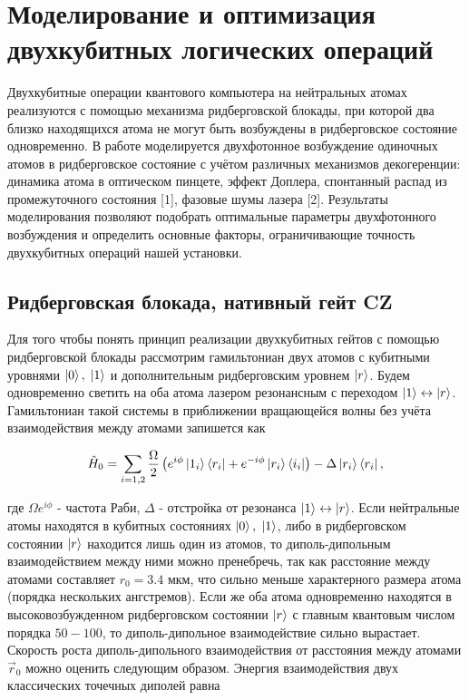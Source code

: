 \section{Моделирование и оптимизация двухкубитных логических операций}
\label{sec:chapter_4}

Двухкубитные операции квантового компьютера на нейтральных атомах реализуются с помощью механизма ридберговской блокады, при которой два близко находящихся атома не могут быть возбуждены в ридберговское состояние одновременно. В работе моделируется двухфотонное возбуждение одиночных атомов в ридберговское состояние с учётом различных механизмов декогеренции: динамика атома в оптическом пинцете, эффект Доплера, спонтанный распад из промежуточного состояния [1], фазовые шумы лазера [2]. Результаты моделирования позволяют подобрать оптимальные параметры двухфотонного возбуждения и определить основные факторы, ограничивающие точность двухкубитных операций нашей установки.

\subsection{Ридберговская блокада, нативный гейт CZ}

Для того чтобы понять принцип реализации двухкубитных гейтов с помощью ридберговской блокады рассмотрим гамильтониан двух атомов с кубитными уровнями $\left| 0 \right\rangle, \; \left| 1 \right\rangle$ и дополнительным ридберговским уровнем $\left| r \right\rangle$. Будем одновременно светить на оба атома лазером резонансным с переходом $\left| 1 \right\rangle \leftrightarrow \left| r \right\rangle$. Гамильтониан такой системы в приближении вращающейся волны без учёта взаимодействия между атомами запишется как 

\begin{equation}
	\hat{H}_0 = \sum_{i=1,2}\frac{\Omega}{2}\left(e^{i\phi}\left| 1_i \right\rangle\left\langle r_i \right| + e^{-i\phi}\left| r_i \right\rangle\left\langle i_i \right|\right)-\Delta \left| r_i \right\rangle\left\langle r_i \right|,
\end{equation}

где $\Omega e^{i\phi}$ - частота Раби, $\Delta$ - отстройка от резонанса $\left| 1 \right\rangle \leftrightarrow \left| r \right\rangle$. Если нейтральные атомы находятся в кубитных состояниях $\left| 0 \right\rangle,\; \left| 1 \right\rangle$, либо в ридберговском состоянии $\left| r \right\rangle$ находится лишь один из атомов, то диполь-дипольным взаимодействием между ними можно пренебречь, так как расстояние между атомами составляет $r_0 = 3.4 \text{ мкм}$, что сильно меньше характерного размера атома (порядка нескольких ангстремов). Если же оба атома одновременно находятся в высоковозбужденном ридберговском состоянии $\left| r \right\rangle$ с главным квантовым числом порядка $50-100$, то диполь-дипольное взаимодействие сильно вырастает. Скорость роста диполь-дипольного взаимодействия от расстояния между атомами $\vec{r}_0$ можно оценить следующим образом. Энергия взаимодействия двух классических точечных диполей равна

